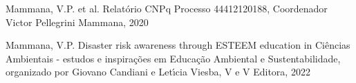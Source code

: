 \documentclass[
12pt,		%
openright,	%
twoside,  %
a4paper,			%
chapter=TITLE,		%
english,			%
french,				%
spanish,			%
brazil				%
]{USPSC-classe/USPSC}
\begin{document}
\begin{flushleft}
\begin{flushleft}
\begin{flushleft}
\begin{flushleft}
\begin{flushleft}
\begin{flushleft}
\begin{flushleft}
\begin{flushleft}
\begin{flushleft}
[MAMMANA et al., 2020a] Mammana, V.P. et al. Relat\'orio CNPq Processo 44412120188, Coordenador Victor Pellegrini Mammana, 2020
\end{flushleft}


\end{flushleft}


\end{flushleft}


\end{flushleft}


\end{flushleft}


\end{flushleft}


\end{flushleft}


\end{flushleft}


\end{flushleft}


\begin{flushleft}
\begin{flushleft}
\begin{flushleft}
\begin{flushleft}
\begin{flushleft}
\begin{flushleft}
\begin{flushleft}
\begin{flushleft}
\begin{flushleft}
[MAMMANA et al., 2022a] Mammana, V.P. Disaster risk awareness through ESTEEM education in Ci\^encias Ambientais - estudos e inspira\c{c}\~oes em Educa\c{c}\~ao Ambiental e Sustentabilidade, organizado por Giovano Candiani e Let\'{\i}cia Viesba, V e V Editora, 2022
\end{flushleft}


\end{flushleft}


\end{flushleft}


\end{flushleft}


\end{flushleft}


\end{flushleft}


\end{flushleft}


\end{flushleft}


\end{flushleft}
\end{document}
